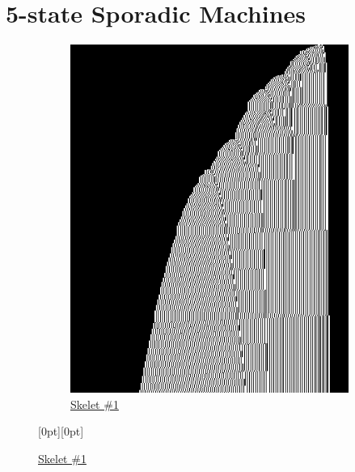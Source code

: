 \section{5-state Sporadic Machines}\label{sec:sporadic}



\begin{figure}[h!]
    \centering

    \begin{minipage}{\textwidth}
        \centering
        \begin{subfigure}{0.3\textwidth}
            \centering
            \includegraphics[width=\linewidth]{figures/sporadic-machines/sk1.png}
            \caption*{\href{https://bbchallenge.org/1RB1RD_1LC0RC_1RA1LD_0RE0LB_---1RC}{Skelet \#1}}
        \end{subfigure}
        \hfill
        \raisebox{8.5em}[0pt][0pt]{%
            \begin{minipage}{0.3\textwidth}
                \centering

\end{minipage}}
\end{minipage}
\end{figure}

